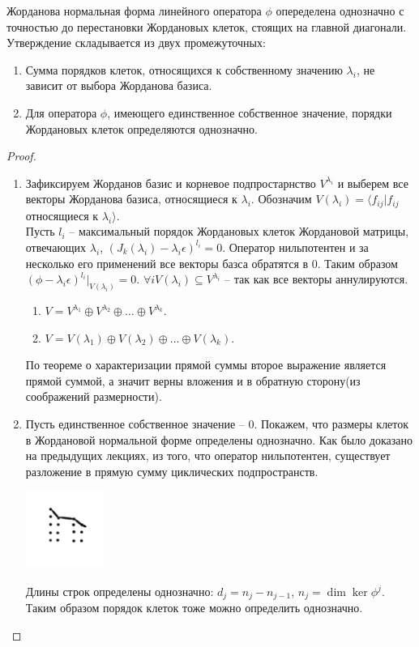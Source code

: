 \begin{theorem}[]
    Жорданова нормальная форма линейного оператора $\phi$ опеределена однозначно с точностью до перестановки Жордановых клеток, стоящих на главной диагонали. 
    Утверждение складывается из двух промежуточных:
    \begin{enumerate}
        \item Сумма порядков клеток, относящихся к собственному значению $\lambda_i$, не зависит от выбора Жорданова базиса.
        \item Для оператора $\phi$, имеющего единственное собственное значение, порядки Жордановых клеток определяются однозначно.
    \end{enumerate}
\end{theorem}

\begin{proof}~
    \begin{enumerate}
        \item  Зафиксируем Жорданов базис и корневое подпростарнство $V^{\lambda_i}$ и выберем все векторы Жорданова базиса, относящиеся к $\lambda_i$. Обозначим $V(\lambda_i) = \langle f_{ij} | f_{ij}$ относящиеся к $\lambda_i \rangle$. \\
        Пусть $l_i$ -- максимальный порядок Жордановых клеток Жордановой матрицы, отвечающих $\lambda_i$, $(J_k(\lambda_i) - \lambda_i \epsilon)^{l_i} = 0$. 
        Оператор нильпотентен и за несколько его применений все векторы базса обратятся в 0.
        Таким образом $(\phi - \lambda_i \epsilon)^{l_i} \vert_{V(\lambda_i)} = 0$.
        $\forall i V(\lambda_i) \subseteq V^{\lambda_i}$ -- так как все векторы аннулируются.
        \begin{enumerate}
            \item $V = V^{\lambda_1} \oplus V^{\lambda_2} \oplus \dots \oplus V^{\lambda_k}$.
            \item $V = V(\lambda_1) \oplus V(\lambda_2) \oplus \dots \oplus V(\lambda_k)$.
        \end{enumerate}
        По теореме о характеризации прямой суммы второе выражение является прямой суммой, а значит верны вложения и в обратную сторону(из соображений размерности).
        \item Пусть единственное собственное значение -- 0. Покажем, что размеры клеток в Жордановой нормальной форме определены однозначно. 
        Как было доказано на предыдущих лекциях, из того, что оператор нильпотентен, существует разложение в прямую сумму циклических подпространств.
        \begin{center}
            \includegraphics[width = 0.2\textwidth]{images/lec6_5.PNG}
        \end{center}
        Длины строк определены однозначно: $d_j = n_j - n_{j-1}$, $n_j = \dim \ker \phi^j$. Таким образом порядок клеток тоже можно определить однозначно.
    \end{enumerate}
\end{proof}